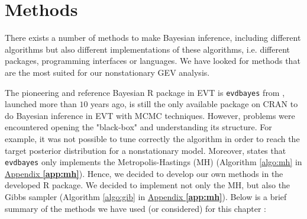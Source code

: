 \section{Methods }\label{sec:meth}


There exists a number of methods to make Bayesian inference, including different algorithms but also different implementations of these algorithms, i.e. different packages, programming interfaces or languages. We have looked for methods that are the most suited for our nonstationary GEV analysis.

The pioneering and reference Bayesian R package in EVT is \texttt{evdbayes} from \citet{ribatet_users_2006}, launched more than $10$ years ago, is still the only available package on CRAN to do Bayesian inference in EVT with MCMC techniques. However, problems were encountered opening the "black-box" and understanding its structure. For example, it was not possible to tune correctly the algorithm in order to reach the target posterior distribution for a nonstationary model. Moreover, \citet{hartmann_bayesian_2016} states that \texttt{evdbayes} only implements the Metropolis-Hastings (MH) (Algorithm \ref{algo:mh} in \hyperref[app:mh]{Appendix \textbf{\ref{app:mh}}}).
Hence, we decided to develop our own methods in the developed R package. We decided to implement not only the MH,  but also the Gibbs sampler (Algorithm \ref{algo:gib} in \hyperref[app:mh]{Appendix \textbf{\ref{app:mh}}}).
Below is a brief summary of the methods we have used (or considered) for this chapter : 
 
